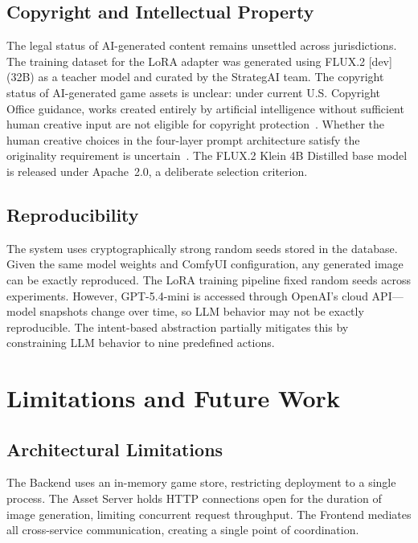 \documentclass[conference]{IEEEtran}
\begin{document}
\subsection{Copyright and Intellectual Property}

The legal status of AI-generated content remains unsettled across
jurisdictions. The training dataset for the LoRA adapter was generated
using FLUX.2 [dev] (32B) as a teacher model and curated by the StrategAI
team. The copyright status of AI-generated game assets is unclear: under
current U.S. Copyright Office guidance, works created entirely by
artificial intelligence without sufficient human creative input are not
eligible for copyright protection~\cite{samuelson2023generative}. Whether the
human creative choices in the four-layer prompt architecture satisfy the
originality requirement is uncertain~\cite{hertzmann2018cancomputers}. The
FLUX.2 Klein 4B Distilled base model is released under Apache~2.0, a
deliberate selection criterion.

\subsection{Reproducibility}

The system uses cryptographically strong random seeds stored in the
database. Given the same model weights and ComfyUI configuration, any
generated image can be exactly reproduced. The LoRA training pipeline fixed
random seeds across experiments. However, GPT-5.4-mini is accessed through
OpenAI's cloud API---model snapshots change over time, so LLM behavior may
not be exactly reproducible. The intent-based abstraction partially
mitigates this by constraining LLM behavior to nine predefined actions.

\FloatBarrier
\section{Limitations and Future Work}
\label{sec:limitations}

\subsection{Architectural Limitations}

The Backend uses an in-memory game store, restricting deployment to a
single process. The Asset Server holds HTTP connections open for the
duration of image generation, limiting concurrent request throughput. The
Frontend mediates all cross-service communication, creating a single point
of coordination.
\end{document}
